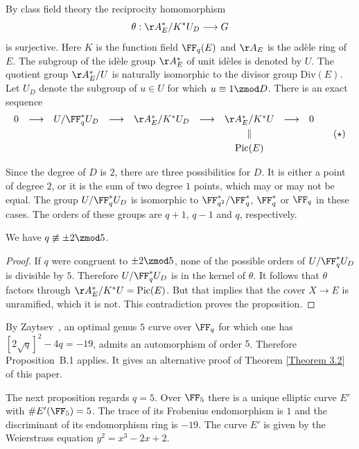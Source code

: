 By class field theory the reciprocity homomorphism
\[
\theta : \AA_E^*/K^*U_D \longrightarrow G
\]
is surjective. Here $K$ is the function field $\FF_q(E)$ and $\AA_E$ is the
ad\`ele ring of $E$. The subgroup of the id\`ele group $\AA_E^*$ of unit
id\`eles is denoted by $U$. The quotient group $\AA_E^*/U$ is naturally
isomorphic to the divisor group $\mathrm{Div}(E)$. Let $U_D$ denote the subgroup
of $u \in U$ for which $u \equiv 1 \zmod D$. There is an exact sequence
\begin{equation*}
 \begin{matrix}
0 & \longrightarrow & U/\FF_q^*U_D
& \longrightarrow & \AA_E^*/K^*U_D
& \longrightarrow & \AA_E^*/K^*U
& \longrightarrow & 0 \\[0.3em]
&&&&&& \Vert && \\[0.3em]
&&&&&& \mathrm{Pic}(E) &&
\end{matrix}   \tag{$\star$}
\end{equation*}

 
Since the degree of $D$ is $2$, there are three possibilities for $D$. It is
either a point of degree $2$, or it is the sum of two degree $1$ points, which
may or may not be equal. The group $U/\FF_q^*U_D$ is isomorphic to
$\FF_{q^2}^*/\FF_q^*$, $\FF_q^*$ or $\FF_q$ in these cases. The orders of these
groups are $q+1$, $q-1$ and $q$, respectively.

\begin{proposition}
We have $q \not\equiv \pm 2 \zmod 5$.
\end{proposition}
\begin{proof}
If $q$ were congruent to $\pm 2 \zmod 5$, none of the possible orders of
$U/\FF_q^*U_D$ is divisible by $5$. Therefore $U/\FF_q^*U_D$ is in the kernel of
$\theta$. It follows that $\theta$ factors through
$\AA_E^*/K^*U = \mathrm{Pic}(E)$. But that implies that the cover
$X \rightarrow E$ is unramified, which it is not. This contradiction proves the
proposition.
\end{proof}

By Zaytsev~\cite[Thm.~4.13]{zaytsevoptimal}, an optimal genus $5$ curve over $\FF_q$
for which one has $[2\sqrt{q}]^2 - 4q = -19$, admits an automorphism of order $5$. Therefore Proposition~B.1 applies. It gives an alternative proof of Theorem \ref{Theorem 3.2} of this paper.

\vspace{0.5cm}

The next proposition regards $q=5$. Over $\FF_5$ there is a unique elliptic
curve $E'$ with $\#E'(\FF_5)=5$. The trace of its Frobenius endomorphism is $1$
and the discriminant of its endomorphism ring is $-19$. The curve $E'$ is given
by the Weierstrass equation $y^2 = x^3 - 2x + 2$.


